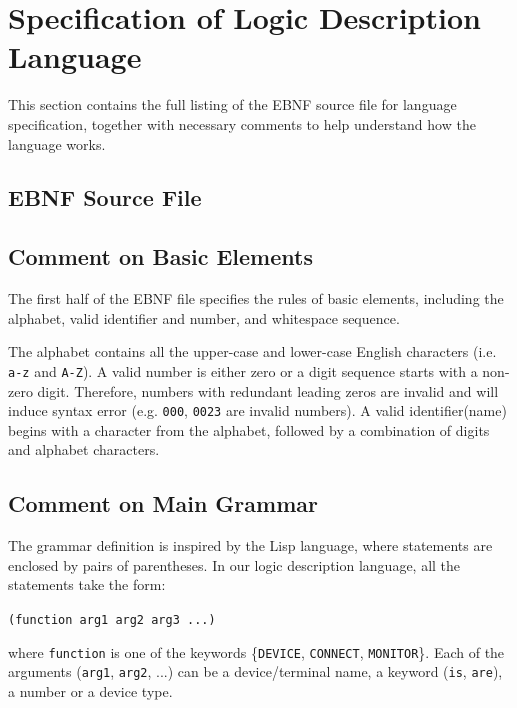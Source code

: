 \documentclass[12pt]{article}
\def\n{\noindent}
\begin{document}
\section{Specification of Logic Description Language}

This section contains the full listing of the EBNF source file for language
specification, together with necessary comments to help understand how the
language works.

\subsection{EBNF Source File}



\subsection{Comment on Basic Elements}

The first half of the EBNF file specifies the rules of basic elements, including the
alphabet, valid identifier and number, and whitespace sequence.

\vspace{0.3cm}

\n The alphabet contains all the upper-case and lower-case English characters
(i.e. \texttt{a-z} and \texttt{A-Z}). A valid number is either zero or a digit
sequence starts with a non-zero digit. Therefore, numbers with redundant leading
zeros are invalid and will induce syntax error (e.g. \texttt{000}, \texttt{0023}
are invalid numbers). A valid identifier(name) begins with a character from the
alphabet, followed by a combination of digits and alphabet characters.

\subsection{Comment on Main Grammar}

The grammar definition is inspired by the Lisp language, where statements are
enclosed by pairs of parentheses. In our logic description language, all the
statements take the form:

\vspace{0.5cm}
\texttt{(function arg1 arg2 arg3 ...)}
\vspace{0.5cm}

\n where \texttt{function} is one of the keywords \{\texttt{DEVICE},
\texttt{CONNECT}, \texttt{MONITOR}\}. Each of the arguments (\texttt{arg1},
\texttt{arg2}, ...) can be a device/terminal name, a keyword (\texttt{is},
\texttt{are}), a number or a device type. \vspace{0.3cm}
\end{document}
